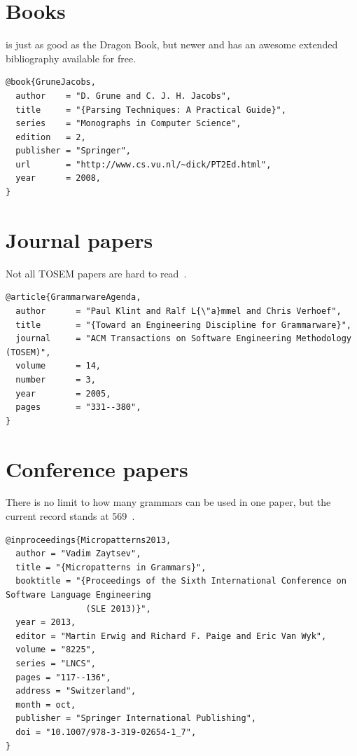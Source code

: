 \documentclass{uvamscse}
\begin{document}
\section{Books}

\cite{GruneJacobs} is just as good as the Dragon Book, but newer and has an
awesome extended bibliography available for free.

\begin{snippet}
\begin{verbatim}
@book{GruneJacobs,
  author    = "D. Grune and C. J. H. Jacobs",
  title     = "{Parsing Techniques: A Practical Guide}",
  series    = "Monographs in Computer Science",
  edition   = 2,
  publisher = "Springer",
  url       = "http://www.cs.vu.nl/~dick/PT2Ed.html",
  year      = 2008,
}
\end{verbatim}
\end{snippet}

\section{Journal papers}

Not all TOSEM papers are hard to read~\cite{GrammarwareAgenda}.

\begin{snippet}
\begin{verbatim}
@article{GrammarwareAgenda,
  author      = "Paul Klint and Ralf L{\"a}mmel and Chris Verhoef",
  title       = "{Toward an Engineering Discipline for Grammarware}",
  journal     = "ACM Transactions on Software Engineering Methodology (TOSEM)",
  volume      = 14,
  number      = 3,
  year        = 2005,
  pages       = "331--380",
}
\end{verbatim}
\end{snippet}

\section{Conference papers}

There is no limit to how many grammars can be used in one paper, but the
current record stands at 569~\cite{Micropatterns2013}.

\begin{snippet}
\begin{verbatim}
@inproceedings{Micropatterns2013,
  author = "Vadim Zaytsev",
  title = "{Micropatterns in Grammars}",
  booktitle = "{Proceedings of the Sixth International Conference on Software Language Engineering
                (SLE 2013)}",
  year = 2013,
  editor = "Martin Erwig and Richard F. Paige and Eric Van Wyk",
  volume = "8225",
  series = "LNCS",
  pages = "117--136",
  address = "Switzerland",
  month = oct,
  publisher = "Springer International Publishing",
  doi = "10.1007/978-3-319-02654-1_7",
}
\end{verbatim}
\end{snippet}
\end{document}
